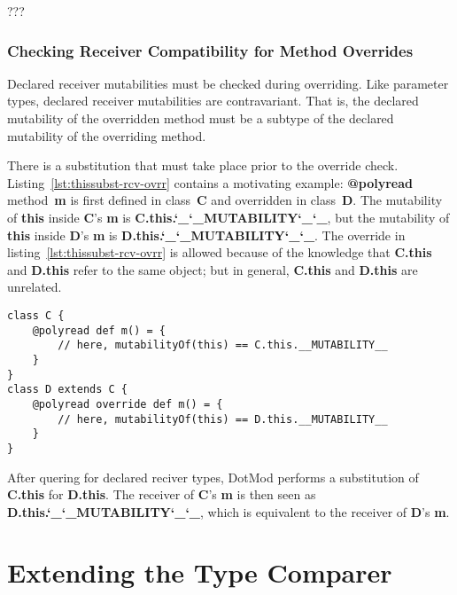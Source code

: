 \documentclass[11pt]{report}
\newcommand{\und}{\char`_}
\newcommand{\MUTABILITY}{\und\und MUTABILITY\und\und }
\newcommand{\cdf}{\bf\ttfamily} %
\newcommand{\cd}{\cdf\small}  %
\begin{document}
???


\subsubsection{Checking Receiver Compatibility for Method Overrides}

Declared receiver mutabilities must be checked during overriding.
Like parameter types, declared receiver mutabilities are contravariant.
That is, the declared mutability of the overridden method must be a subtype of the declared mutability of the overriding method.

There is a substitution that must take place prior to the override check. Listing~\ref{lst:thissubst-rcv-ovrr} contains a motivating example: {\cd @polyread} method~{\cd m} is first defined in class~{\cd C} and overridden in class~{\cd D}. The mutability of {\cd this} inside \mbox{{\cd C}'s} {\cd m} is \mbox{\cd C.this.\MUTABILITY}, but the mutability of {\cd this} inside \mbox{{\cd D}'s} {\cd m} is \mbox{\cd D.this.\MUTABILITY}. The override in listing~\ref{lst:thissubst-rcv-ovrr} is allowed because of the knowledge that \mbox{\cd C.this} and \mbox{\cd D.this} refer to the same object; but in general, \mbox{\cd C.this} and \mbox{\cd D.this} are unrelated.

\begin{lstlisting}[float=htbp, caption={This-substitution in Receiver Override Checking}, label={lst:thissubst-rcv-ovrr}]
class C {
	@polyread def m() = {
		// here, mutabilityOf(this) == C.this.__MUTABILITY__
	}
}
class D extends C {
	@polyread override def m() = {
		// here, mutabilityOf(this) == D.this.__MUTABILITY__
	}
}
\end{lstlisting}

After quering for declared reciver types, DotMod performs a substitution of \mbox{\cd C.this} for \mbox{\cd D.this}. The receiver of \mbox{{\cd C}'s} {\cd m} is then seen as \mbox{\cd D.this.\MUTABILITY}, which is equivalent to the receiver of \mbox{{\cd D}'s} {\cd m}.



\section{Extending the Type Comparer} \label{sec:type-comparer}
\end{document}

